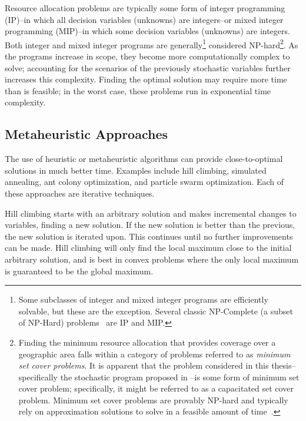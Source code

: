 \documentclass[12pt,dvipsnames]{report}
\begin{document}
Resource allocation problems are typically some form of integer programming (IP)--in which all decision variables (unknowns) are integers--or mixed integer programming (MIP)--in which some decision variables (unknowns) are integers.  Both integer and mixed integer programs are generally\footnote{Some subclasses of integer and mixed integer programs are efficiently solvable, but these are the exception.  Several classic NP-Complete (a subset of NP-Hard) problems~\cite{Karp1972} are IP and MIP.} considered NP-hard\footnote{Finding the minimum resource allocation that provides coverage over a geographic area falls within a category of problems referred to as \emph{minimum set cover problems}.  It is apparent that the problem considered in this thesis--specifically the stochastic program proposed in --is some form of minimum set cover problem; specifically, it might be referred to as a capacitated set cover problem.  Minimum set cover problems are provably NP-hard and typically rely on approximation solutions to solve in a feasible amount of time~\cite{Korte:2007:CombOptimization}.}.  As the programs increase in scope, they become more computationally complex to solve; accounting for the scenarios of the previously stochastic variables further increases this complexity.  Finding the optimal solution may require more time than is feasible; in the worst case, these problems run in exponential time complexity.

\subsection{Metaheuristic Approaches} \label{subsec:optreview_meta}

The use of heuristic or metaheuristic algorithms can provide close-to-optimal solutions in much better time.  Examples include hill climbing, simulated annealing, ant colony optimization, and particle swarm optimization.  Each of these approaches are iterative techniques.

Hill climbing starts with an arbitrary solution and makes incremental changes to variables, finding a new solution.  If the new solution is better than the previous, the new solution is iterated upon.  This continues until no further improvements can be made.  Hill climbing will only find the local maximum close to the initial arbitrary solution, and is best in convex problems where the only local maximum is guaranteed to be the global maximum.
\end{document}
